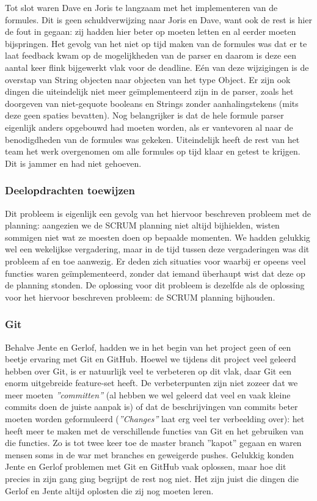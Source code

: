 \documentclass[a4paper,11pt,titlepage]{scrartcl}
\begin{document}
Tot slot waren Dave en Joris te langzaam met het implementeren van de formules. Dit is geen schuldverwijzing naar Joris en Dave, want ook de rest is hier de fout in gegaan: zij hadden hier beter op moeten letten en al eerder moeten bijspringen. Het gevolg van het niet op tijd maken van de formules was dat er te laat feedback kwam op de mogelijkheden van de parser en daarom is deze een aantal keer flink bijgewerkt vlak voor de deadline. Eén van deze wijzigingen is de overstap van String objecten naar objecten van het type Object. Er zijn ook dingen die uiteindelijk niet meer geïmplementeerd zijn in de parser, zoals het doorgeven van niet-gequote booleans en Strings zonder aanhalingstekens (mits deze geen spaties bevatten). Nog belangrijker is dat de hele formule parser eigenlijk anders opgebouwd had moeten worden, als er vantevoren al naar de benodigdheden van de formules was gekeken. Uiteindelijk heeft de rest van het team het werk overgenomen om alle formules op tijd klaar en getest te krijgen. Dit is jammer en had niet gehoeven.

\subsubsection{Deelopdrachten toewijzen}
Dit probleem is eigenlijk een gevolg van het hiervoor beschreven probleem met de planning: aangezien we de SCRUM planning niet altijd bijhielden, wisten sommigen niet wat ze moesten doen op bepaalde momenten. We hadden gelukkig wel een wekelijkse vergadering, maar in de tijd tussen deze vergaderingen was dit probleem af en toe aanwezig. Er deden zich situaties voor waarbij er opeens veel functies waren ge\"{i}mplementeerd, zonder dat iemand überhaupt wist dat deze op de planning stonden. De oplossing voor dit probleem is dezelfde als de oplossing voor het hiervoor beschreven probleem: de SCRUM planning bijhouden.

\subsubsection{Git}
Behalve Jente en Gerlof, hadden we in het begin van het project geen of een beetje ervaring met Git en GitHub. Hoewel we tijdens dit project veel geleerd hebben over Git, is er natuurlijk veel te verbeteren op dit vlak, daar Git een enorm uitgebreide feature-set heeft. De verbeterpunten zijn niet zozeer dat we meer moeten \textit{''committen''} (al hebben we wel geleerd dat veel en vaak kleine commits doen de juiste aanpak is) of dat de beschrijvingen van commits beter moeten worden geformuleerd (\textit{''Changes''} laat erg veel ter verbeelding over): het heeft meer te maken met de verschillende functies van Git en het gebruiken van die functies. Zo is tot twee keer toe de master branch ''kapot'' gegaan en waren mensen soms in de war met branches en geweigerde pushes. Gelukkig konden Jente en Gerlof problemen met Git en GitHub vaak oplossen, maar hoe dit precies in zijn gang ging begrijpt de rest nog niet. Het zijn juist die dingen die Gerlof en Jente altijd oplosten die zij nog moeten leren.
\end{document}
